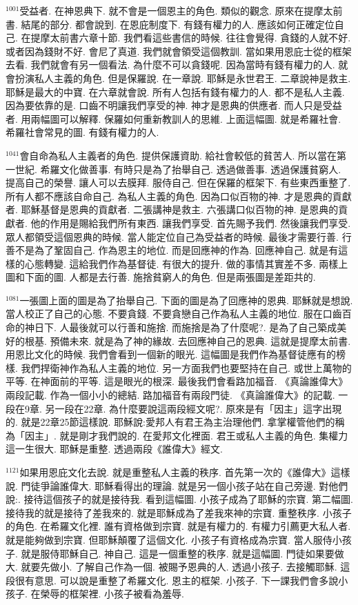 \documentclass{book}
\begin{document}
$^{1001}$受益者.
在神恩典下.
就不會是一個恩主的角色.
類似的觀念.
原來在提摩太前書.
結尾的部分.
都會說到.
在恩庇制度下.
有錢有權力的人.
應該如何正確定位自己.
在提摩太前書六章十節.
我們看這些書信的時候.
往往會覺得.
貪錢的人就不好.
或者因為錢財不好.
會尼了真道.
我們就會領受這個教訓.
當如果用恩庇士從的框架去看.
我們就會有另一個看法.
為什麼不可以貪錢呢.
因為當時有錢有權力的人.
就會扮演私人主義的角色.
但是保羅說.
在一章說.
耶穌是永世君王.
二章說神是救主.
耶穌是最大的中寶.
在六章就會說.
所有人包括有錢有權力的人.
都不是私人主義.
因為要依靠的是.
口齒不明讓我們享受的神.
神才是恩典的供應者.
而人只是受益者.
用兩幅圖可以解釋.
保羅如何重新教訓人的思維.
上面這幅圖.
就是希羅社會.
希羅社會常見的圖.
有錢有權力的人.

$^{1041}$會自命為私人主義者的角色.
提供保護資助.
給社會較低的貧苦人.
所以當在第一世紀.
希羅文化做善事.
有時只是為了抬舉自己.
透過做善事.
透過保護貧窮人.
提高自己的榮譽.
讓人可以去膜拜.
服侍自己.
但在保羅的框架下.
有些東西重整了.
所有人都不應該自命自己.
為私人主義的角色.
因為口似百物的神.
才是恩典的貢獻者.
耶穌基督是恩典的貢獻者.
二張講神是救主.
六張講口似百物的神.
是恩典的貢獻者.
他的作用是賜給我們所有東西.
讓我們享受.
首先賜予我們.
然後讓我們享受.
眾人都領受這個恩典的時候.
當人能定位自己為受益者的時候.
最後才需要行善.
行善不是為了鞏固自己.
作為恩主的地位.
而是回應神的作為.
回應神自己.
就是有這樣的心態轉變.
這給我們作為基督徒.
有很大的提升.
做的事情其實差不多.
兩樣上圖和下面的圖.
人都是去行善.
施捨貧窮人的角色.
但是兩張圖是差距共的.

$^{1081}$一張圖上面的圖是為了抬舉自己.
下面的圖是為了回應神的恩典.
耶穌就是想說.
當人校正了自己的心態.
不要貪錢.
不要貪戀自己作為私人主義的地位.
服在口齒百命的神日下.
人最後就可以行善和施捨.
而施捨是為了什麼呢?.
是為了自己築成美好的根基.
預備未來.
就是為了神的緣故.
去回應神自己的恩典.
這就是提摩太前書.
用恩比文化的時候.
我們會看到一個新的眼光.
這幅圖是我們作為基督徒應有的榜樣.
我們捍衛神作為私人主義的地位.
另一方面我們也要堅持在自己.
或世上萬物的平等.
在神面前的平等.
這是眼光的根深.
最後我們會看路加福音.
《真論誰偉大》兩段記載.
作為一個小小的總結.
路加福音有兩段門徒.
《真論誰偉大》的記載.
一段在9章.
另一段在22章.
為什麼要說這兩段經文呢?.
原來是有「因主」這字出現的.
就是22章25節這樣說.
耶穌說:愛邦人有君王為主治理他們.
拿掌權管他們的稱為「因主」.
就是剛才我們說的.
在愛邦文化裡面.
君王或私人主義的角色.
集權力這一生很大.
耶穌是重整.
透過兩段《誰偉大》經文.

$^{1121}$如果用恩庇文化去說.
就是重整私人主義的秩序.
首先第一次的《誰偉大》這樣說.
門徒爭論誰偉大.
耶穌看得出的理論.
就是另一個小孩子站在自己旁邊.
對他們說:.
接待這個孩子的就是接待我.
看到這幅圖.
小孩子成為了耶穌的宗寶.
第二幅圖.
接待我的就是接待了差我來的.
就是耶穌成為了差我來神的宗寶.
重整秩序.
小孩子的角色.
在希羅文化裡.
誰有資格做到宗寶.
就是有權力的.
有權力引薦更大私人者.
就是能夠做到宗寶.
但耶穌顛覆了這個文化.
小孩子有資格成為宗寶.
當人服侍小孩子.
就是服侍耶穌自己.
神自己.
這是一個重整的秩序.
就是這幅圖.
門徒如果要做大.
就要先做小.
了解自己作為一個.
被賜予恩典的人.
透過小孩子.
去接觸耶穌.
這段很有意思.
可以說是重整了希羅文化.
恩主的框架.
小孩子.
下一課我們會多說小孩子.
在榮辱的框架裡.
小孩子被看為羞辱.
\end{document}
